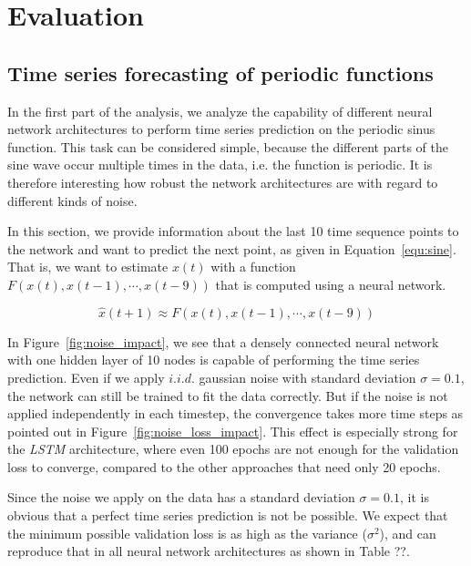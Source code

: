 \documentclass{article}
\begin{document}
\section{Evaluation} 
\subsection{Time series forecasting of periodic functions}
\label{sec:sine} 
In the first part of the analysis, we analyze the capability of different neural
network architectures to perform time series prediction on the periodic sinus
function. This task can be considered simple, because the different parts of the
sine wave occur multiple times in the data, i.e. the function is periodic.
It is therefore interesting how
robust the network architectures are with regard to different kinds of noise.

In this section, we provide information about the last 10 time sequence points
to the network and want to predict the next point, as given in 
Equation~\ref{equ:sine}. That is, we want to estimate $x(t)$ with a function 
$F(x(t), x(t-1), \cdots, x(t-9))$ that is computed using a neural network.

\begin{equation}
  \hat{x} (t + 1) \approx F(x(t), x(t-1), \cdots, x(t-9))
  \label{equ:sine}
\end{equation}

In Figure~\ref{fig:noise_impact}, we see that a densely connected neural network
with one hidden layer of 10 nodes is capable of performing the time series
prediction. Even if we apply $i.i.d.$ gaussian noise with standard
deviation $\sigma = 0.1$, the
network can still be trained to fit the data correctly. But if the noise is not
applied independently in each timestep, the convergence takes more time steps as
pointed out in Figure~\ref{fig:noise_loss_impact}. This effect is especially 
strong for the \emph{LSTM} architecture, where even 100 epochs are not enough
for the validation loss to converge, compared to the other approaches that need
only 20 epochs.

Since the noise we apply on the data has a standard deviation $\sigma = 0.1$,
it is obvious that a perfect time series prediction is not be possible. We 
expect that the minimum possible validation loss is as high as the variance 
($\sigma^2$), and can reproduce that in all neural network architectures as
shown in Table ??.%
  
\end{document}
